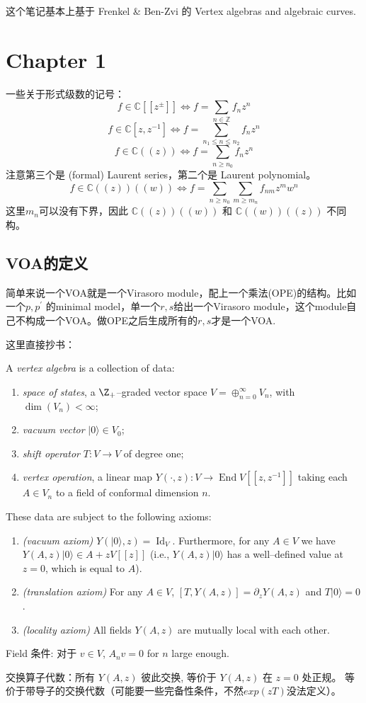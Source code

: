 \newcommand{\vac}{|0\rangle}

这个笔记基本上基于 Frenkel \& Ben-Zvi 的 Vertex algebras and algebraic curves. 
\section{Chapter 1}
一些关于形式级数的记号：\[f\in \mathbb{C}[[z^{\pm}]]\iff f=\sum_{n\in\mathbb{Z}}f_nz^n\]
\[f\in \mathbb{C}[z,z^{-1}]\iff f=\sum_{n_1\le n\le n_2}f_nz^n\]
\[f\in \mathbb{C}((z))\iff f=\sum_{n\ge n_0}f_nz^n\]
注意第三个是 (formal) Laurent series，第二个是 Laurent polynomial。
\[f\in \mathbb{C}((z))((w))\iff f=\sum_{n\ge n_0}\sum_{m\ge m_n}f_{nm} z^m w^n\]
这里$m_n$可以没有下界，因此 $\mathbb{C}((z))((w))$ 和 $\mathbb{C}((w))((z))$ 不同构。
\subsection{VOA的定义}
简单来说一个VOA就是一个Virasoro module，配上一个乘法(OPE)的结构。比如一个$p,p^{\prime}$
的minimal model，单一个$r,s$给出一个Virasoro module，这个module自己不构成一个VOA。做OPE之后生成所有的$r,s$才是一个VOA.

这里直接抄书：
\begin{definition}
    A {\em vertex algebra} is a collection of data:

\begin{enumerate}
\item[$\bullet$] {\em space of states}, a $\Z_+$--graded vector
space $V=\oplus_{n=0}^\infty{V_n}$, with $\operatorname{dim}(V_n)<\infty$;
\item[$\bullet$] {\em vacuum vector} $\vac\in V_0$;
\item[$\bullet$] {\em shift operator} $T:V\to V$ of
degree one;
\item[$\bullet$] {\em vertex operation}, a linear map $Y(\cdot,z):V\to
\operatorname{End} V[[z,z^{-1}]]$ taking each $A\in V_n$ to a field of conformal
dimension $n$.
\end{enumerate}

These data are subject to the following axioms:
\begin{enumerate}
\item[$\bullet$] {\em (vacuum axiom)}
$Y(\vac,z)=\operatorname{Id}_V$. Furthermore, for any $A\in V$ we have
 $Y(A,z)\vac\in A + zV[[z]]$ (i.e., $Y(A,z)\vac$ has a
well--defined value at $z=0$, which is equal to $A$).
\item[$\bullet$] {\em (translation axiom)} For any $A\in V$, 
$[T,Y(A,z)]=\partial_z Y(A,z)$ and $T\vac=0$.
\item[$\bullet$] {\em (locality axiom)} All fields $Y(A,z)$ are
mutually local with each other.
\end{enumerate} 
\end{definition}
Field 条件: 对于 $v\in V$, $A_n v=0$ for $n$ large enough.

交换算子代数：所有 $Y(A,z)$ 彼此交换, 等价于 $Y(A,z)$ 在 $z=0$ 处正规。
等价于带导子的交换代数（可能要一些完备性条件，不然$exp(zT)$没法定义）。
